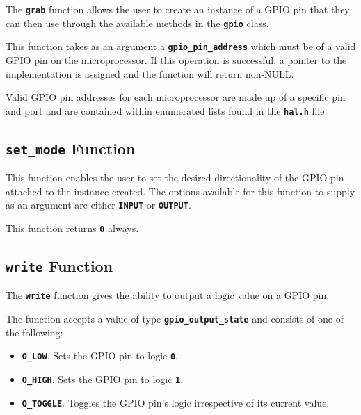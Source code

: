 \documentclass[a4paper, oneside, 11pt, titlepage, onecolumn, openright]{report}
\begin{document}
					The \textbf{\texttt{grab}} function allows the user to create an instance of a GPIO pin that they can then use through the available methods in the \textbf{\texttt{gpio}} class. 
			
This function takes as an argument a \textbf{\texttt{gpio\_pin\_address}} which must be of a valid GPIO pin on the microprocessor. If this operation is successful, a pointer to the implementation is assigned and the function will return non-NULL.
			
Valid GPIO pin addresses for each microprocessor are made up of a specific pin and port and are contained within enumerated lists found in the \textbf{\texttt{hal.h}} file. 			

				\subsection{\textbf{\texttt{set\_mode}} Function}
					\label{ss:Hardware Abstraction Libraries:gpio Module:set_mode Function}
					
					This function enables the user to set the desired directionality of the GPIO pin attached to the instance created. The options available for this function to supply as an argument are either \textbf{\texttt{INPUT}} or \textbf{\texttt{OUTPUT}}.
			
This function returns \textbf{\texttt{0}} always.
			
				\subsection{\textbf{\texttt{write}} Function}
					\label{ss:Hardware Abstraction Libraries:gpio Module:write Function}
			
					The \textbf{\texttt{write}} function gives the ability to output a logic value on a GPIO pin.
			
The function accepts a value of type \textbf{\texttt{gpio\_output\_state}} and consists of one of the following:
			
					\begin{itemize}
					
						\item \textbf{\texttt{O\_LOW}}. Sets the GPIO pin to logic \textbf{\texttt{0}}.

						\item \textbf{\texttt{O\_HIGH}}. Sets the GPIO pin to logic \textbf{\texttt{1}}.

						\item \textbf{\texttt{O\_TOGGLE}}. Toggles the GPIO pin's logic irrespective of its current value.

					\end{itemize}
\end{document}
